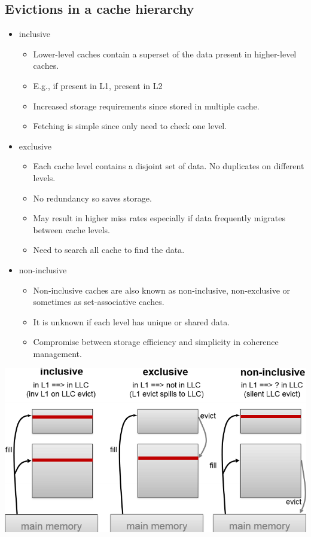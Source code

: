 \documentclass[letterpaper,12pt]{article}
\begin{document}
\subsection{Evictions in a cache hierarchy}
\begin{itemize}
    \item inclusive
          \begin{itemize}
              \item Lower-level caches contain a superset of the data present in higher-level caches.
              \item E.g., if present in L1, present in L2
              \item Increased storage requirements since stored in multiple cache.
              \item Fetching is simple since only need to check one level.
          \end{itemize}
    \item exclusive
          \begin{itemize}
              \item Each cache level contains a disjoint set of data. No duplicates on different levels.
              \item No redundancy so saves storage.
              \item May result in higher miss rates especially if data frequently migrates between cache levels.
              \item Need to search all cache to find the data.
          \end{itemize}
    \item non-inclusive
          \begin{itemize}
              \item Non-inclusive caches are also known as non-inclusive, non-exclusive or sometimes as set-associative caches.
              \item It is unknown if each level has unique or shared data.
              \item Compromise between storage efficiency and simplicity in coherence management.
          \end{itemize}
\end{itemize}

\includegraphics*[scale = 0.9]{./Image/Eviction in a cache hierarchy.png}
\end{document}
